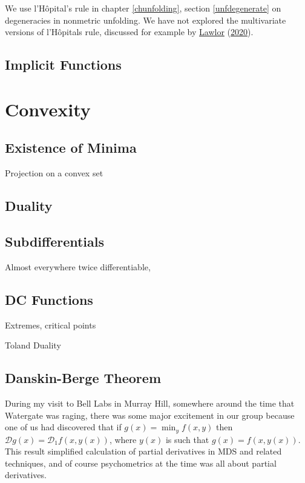 \documentclass[
  12pt,
]{book}
\theoremstyle{definition}
\theoremstyle{definition}
\theoremstyle{definition}
\theoremstyle{definition}
\theoremstyle{remark}
\begin{document}
We use l'Hôpital's rule in chapter \ref{chunfolding}, section \ref{unfdegenerate} on degeneracies in nonmetric unfolding. We have not explored the multivariate versions of l'Hôpitals rule, discussed for example by \protect\hyperlink{ref-lawlor_20}{Lawlor} (\protect\hyperlink{ref-lawlor_20}{2020}).

\hypertarget{mathimplcit}{%
\subsection{Implicit Functions}\label{mathimplcit}}

\hypertarget{mathconvexfuncs}{%
\section{Convexity}\label{mathconvexfuncs}}

\hypertarget{mathextminima}{%
\subsection{Existence of Minima}\label{mathextminima}}

Projection on a convex set

\hypertarget{mathduality}{%
\subsection{Duality}\label{mathduality}}

\hypertarget{mathsubdif}{%
\subsection{Subdifferentials}\label{mathsubdif}}

Almost everywhere twice differentiable,

\hypertarget{mathextdcfunc}{%
\subsection{DC Functions}\label{mathextdcfunc}}

Extremes, critical points

Toland Duality

\hypertarget{mathdanskin}{%
\subsection{Danskin-Berge Theorem}\label{mathdanskin}}

During my visit to Bell Labs in Murray Hill, somewhere around the time that Watergate was raging, there was some major excitement in our group because one of us had discovered that if
\(g(x)=\min_y f(x,y)\) then \(\mathcal{D}g(x)=\mathcal{D}_1f(x,y(x))\), where \(y(x)\) is such that
\(g(x)=f(x,y(x))\). This result simplified calculation of partial derivatives in MDS and related techniques, and of course psychometrics at the time was all about partial derivatives.
\end{document}
